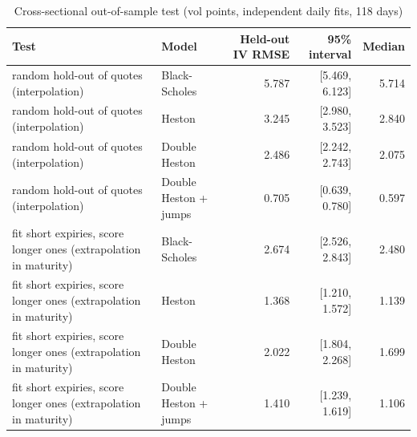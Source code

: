 \begin{table}[ht]
\centering
\small
\caption{Cross-sectional out-of-sample test (vol points, independent daily fits, 118 days)}
\begin{tabular}{llrrr}
\toprule
Test & Model & Held-out IV RMSE & 95\% interval & Median \\
\midrule
random hold-out of quotes (interpolation) & Black-Scholes & 5.787 & [5.469, 6.123] & 5.714 \\
random hold-out of quotes (interpolation) & Heston & 3.245 & [2.980, 3.523] & 2.840 \\
random hold-out of quotes (interpolation) & Double Heston & 2.486 & [2.242, 2.743] & 2.075 \\
random hold-out of quotes (interpolation) & Double Heston + jumps & 0.705 & [0.639, 0.780] & 0.597 \\
fit short expiries, score longer ones (extrapolation in maturity) & Black-Scholes & 2.674 & [2.526, 2.843] & 2.480 \\
fit short expiries, score longer ones (extrapolation in maturity) & Heston & 1.368 & [1.210, 1.572] & 1.139 \\
fit short expiries, score longer ones (extrapolation in maturity) & Double Heston & 2.022 & [1.804, 2.268] & 1.699 \\
fit short expiries, score longer ones (extrapolation in maturity) & Double Heston + jumps & 1.410 & [1.239, 1.619] & 1.106 \\
\bottomrule
\end{tabular}
\end{table}
